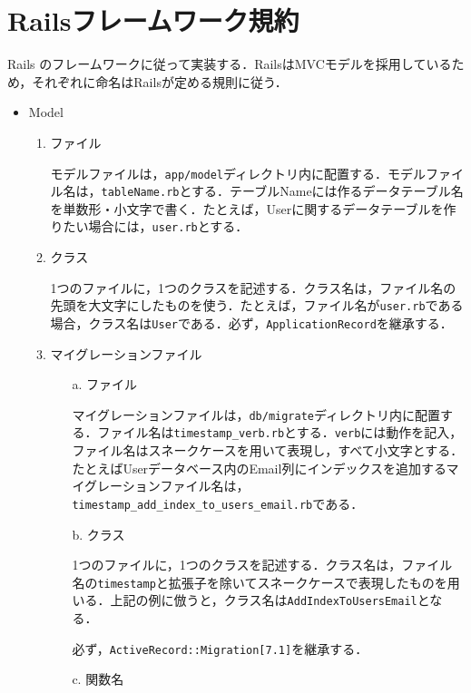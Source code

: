 \newpage

\section{Railsフレームワーク規約}\label{q3.2}
Rails のフレームワークに従って実装する．RailsはMVCモデルを採用しているため，それぞれに命名はRailsが定める規則に従う．
\begin{itemize}
    \item Model
    \begin{enumerate}
        \item ファイル
        
        モデルファイルは，\texttt{app/model}ディレクトリ内に配置する．モデルファイル名は，\texttt{tableName.rb}とする．テーブルNameには作るデータテーブル名を単数形・小文字で書く．たとえば，Userに関するデータテーブルを作りたい場合には，\texttt{user.rb}とする．
        
        \item クラス

        1つのファイルに，1つのクラスを記述する．クラス名は，ファイル名の先頭を大文字にしたものを使う．たとえば，ファイル名が\texttt{user.rb}である場合，クラス名は\texttt{User}である．必ず，\texttt{ApplicationRecord}を継承する．
        
        \item マイグレーションファイル
        \begin{enumerate}
            \item[a.] ファイル
            
            マイグレーションファイルは，\texttt{db/migrate}ディレクトリ内に配置する．ファイル名は\texttt{timestamp\_verb.rb}とする．\texttt{verb}には動作を記入，ファイル名はスネークケースを用いて表現し，すべて小文字とする．たとえばUserデータベース内のEmail列にインデックスを追加するマイグレーションファイル名は，\texttt{timestamp\_add\_index\_to\_users\_email.rb}である．
            \item[b.] クラス

            1つのファイルに，1つのクラスを記述する．クラス名は，ファイル名の\texttt{timestamp}と拡張子を除いてスネークケースで表現したものを用いる．上記の例に倣うと，クラス名は\texttt{AddIndexToUsersEmail}となる．
            
            必ず，\texttt{ActiveRecord::Migration[7.1]}を継承する．

            \item[c.] 関数名


\end{enumerate}
\end{enumerate}
\end{itemize}
